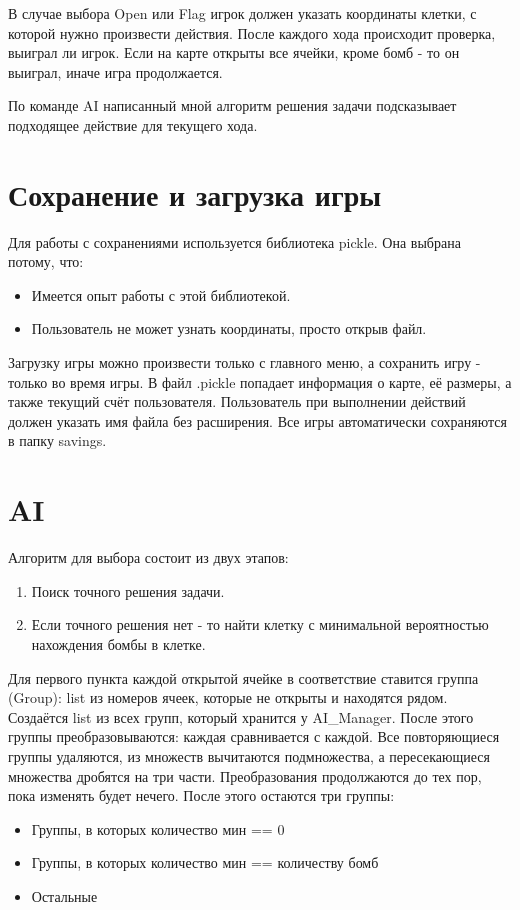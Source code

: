 \documentclass[a4paper,14pt, unknownkeysallowed]{extreport}
\begin{document}
В случае выбора Open или Flag игрок должен указать координаты клетки, с которой нужно произвести действия.
После каждого хода происходит проверка, выиграл ли игрок.
Если на карте открыты все ячейки, кроме бомб - то он выиграл, иначе игра продолжается.

По команде AI написанный мной алгоритм решения задачи подсказывает подходящее действие для текущего хода.

\chapter{Сохранение и загрузка игры}
Для работы с сохранениями используется библиотека pickle.
Она выбрана потому, что:
\begin{itemize}
	\item Имеется опыт работы с этой библиотекой.
	\item Пользователь не может узнать координаты, просто открыв файл.
\end{itemize}

Загрузку игры можно произвести только с главного меню, а сохранить игру - только во время игры.
В файл .pickle попадает информация о карте, её размеры, а также текущий счёт пользователя.
Пользователь при выполнении действий должен указать имя файла без расширения.
Все игры автоматически сохраняются в папку savings.

\chapter{AI}
Алгоритм для выбора состоит из двух этапов:
\begin{enumerate}
	\item Поиск точного решения задачи.
	\item Если точного решения нет - то найти клетку с минимальной вероятностью нахождения бомбы в клетке.
\end{enumerate}

Для первого пункта каждой открытой ячейке в соответствие ставится группа (Group): list из номеров ячеек, которые не открыты и находятся рядом.
Создаётся list из всех групп, который хранится у AI\_Manager.
После этого группы преобразовываются: каждая сравнивается с каждой. 
Все повторяющиеся группы удаляются, из множеств вычитаются подмножества, а пересекающиеся множества дробятся на три части.
Преобразования продолжаются до тех пор, пока изменять будет нечего.
После этого остаются три группы:

\begin{itemize}
	\item Группы, в которых количество мин == 0
	\item Группы, в которых количество мин == количеству бомб
	\item Остальные
\end{itemize}
\end{document}
